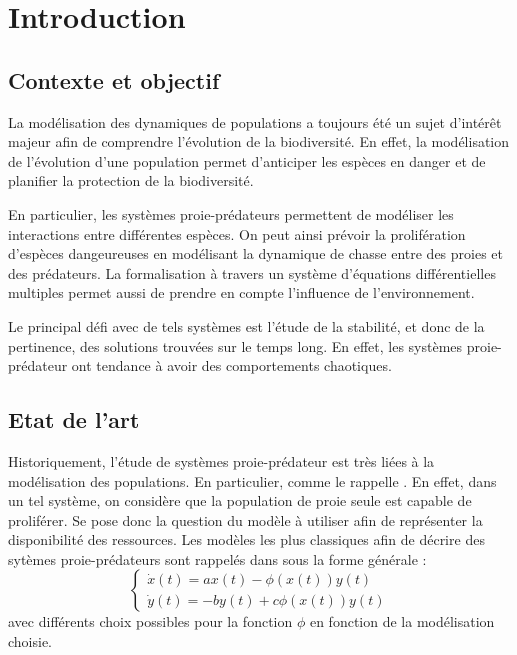 \chapter{Introduction}
\label{ch:Introduction}

\section{Contexte et objectif}
\label{sec:Contexte}

La modélisation des dynamiques de populations a toujours été un sujet d'intérêt majeur afin de comprendre l'évolution de la biodiversité. En effet, la modélisation de l'évolution d'une population permet d'anticiper les espèces en danger et de planifier la protection de la biodiversité.

En particulier, les systèmes proie-prédateurs permettent de modéliser les interactions entre différentes espèces. On peut ainsi prévoir la prolifération d'espèces dangeureuses en modélisant la dynamique de chasse entre des proies et des prédateurs. La formalisation à travers un système d'équations différentielles multiples permet aussi de prendre en compte l'influence de l'environnement.

Le principal défi avec de tels systèmes est l'étude de la stabilité, et donc de la pertinence, des solutions trouvées sur le temps long. En effet, les systèmes proie-prédateur ont tendance à avoir des comportements chaotiques.

\section{Etat de l'art}
\label{sec:Etat}

Historiquement, l'étude de systèmes proie-prédateur est très liées à la modélisation des populations. En particulier, comme le rappelle \cite{BrauerBiology}. En effet, dans un tel système, on considère que la population de proie seule est capable de proliférer. Se pose donc la question du modèle à utiliser afin de représenter la disponibilité des ressources.
Les modèles les plus classiques afin de décrire des sytèmes proie-prédateurs sont rappelés dans \cite{Holl2stoch} sous la forme générale :
\begin{equation}
    \begin{cases}
        \dot{x}(t) = a x(t) - \phi (x(t)) y(t) \\
        \dot{y}(t) = -b y(t) + c \phi (x(t)) y(t)
    \end{cases}
\end{equation}
avec différents choix possibles pour la fonction $\phi$ en fonction de la modélisation choisie.

